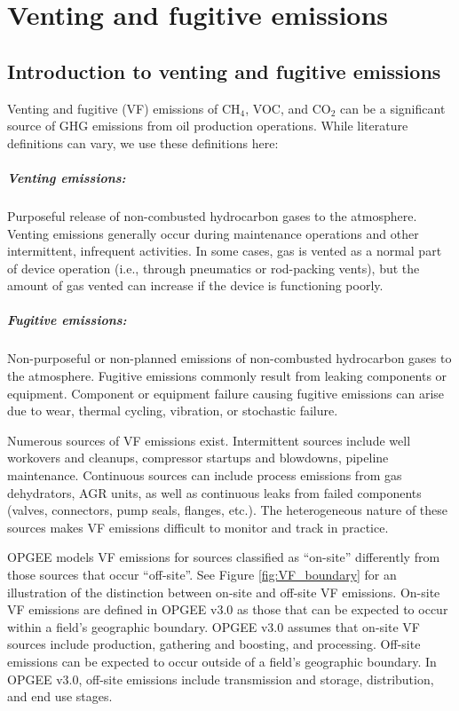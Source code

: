 \documentclass[11pt]{report}
\begin{document}
{{{{%
\clearpage
\chapter{Venting and fugitive emissions}\label{sec:VFF}

\section{Introduction to venting and fugitive emissions}

Venting and fugitive (VF) emissions of CH$_4$, VOC, and CO$_2$ can be a significant source of GHG emissions from oil production operations. While literature definitions can vary, we use these definitions here:

\paragraph{Venting emissions:} Purposeful release of non-combusted hydrocarbon gases to the atmosphere. Venting emissions generally occur during maintenance operations and other intermittent, infrequent activities. In some cases, gas is vented as a normal part of device operation (i.e., through pneumatics or rod-packing vents), but the amount of gas vented can increase if the device is functioning poorly.
\paragraph{Fugitive emissions:} Non-purposeful or non-planned emissions of non-combusted hydrocarbon gases to the atmosphere. Fugitive emissions commonly result from leaking components or equipment. Component or equipment failure causing fugitive emissions can arise due to wear, thermal cycling, vibration, or stochastic failure.

\vspace{0.1in}

Numerous sources of VF emissions exist. Intermittent sources include well workovers and cleanups, compressor startups and blowdowns, pipeline maintenance. Continuous sources can include process emissions from gas dehydrators, AGR units, as well as continuous leaks from failed components (valves, connectors, pump seals, flanges, etc.). The heterogeneous nature of these sources makes VF emissions difficult to monitor and track in practice.

OPGEE models VF emissions for sources classified as ``on-site'' differently from those sources that occur ``off-site''.  See Figure \ref{fig:VF_boundary} for an illustration of the distinction between on-site and off-site VF emissions. On-site VF emissions are defined in OPGEE v3.0 as those that can be expected to occur within a field's geographic boundary. OPGEE v3.0 assumes that on-site VF sources include production, gathering and boosting, and processing.  Off-site emissions can be expected to occur outside of a field's geographic boundary. In OPGEE v3.0, off-site emissions include transmission and storage, distribution, and end use stages.

}}}}
\end{document}
